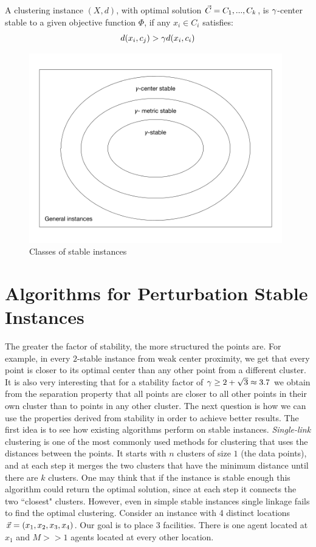 \begin{definition}
A clustering instance $(X, d)$, with optimal solution $\vec{C}= C_1, . . . , C_k$, is $\gamma$-center stable to a given objective function $\Phi$, if any $x_i\in C_i$ satisfies:
\[d(x_i,c_j) > \gamma d(x_i,c_i)\]
\end{definition}

\begin{figure}[ht]
    \centering
    \includegraphics[width=11cm]{Images/stability.png}
    \caption{Classes of stable instances}
    \label{fig:stability}
\end{figure}




\section{Algorithms for Perturbation Stable Instances}

Τhe greater the factor of stability, the more structured the points are. For example, in every $2$-stable instance from weak center proximity, we get that every point is closer to its optimal center than any other point from  a different cluster. It is also very interesting that for a stability factor of $\gamma\ge2+\sqrt{3}\approx3.7$ we obtain from the separation property that all points are closer to all other points in their own cluster than to points in any other cluster. The next question is how we can use the properties derived from stability in order to achieve better results. The first idea is to see how existing algorithms perform on stable instances. \emph{Single-link} clustering is one of the most commonly used methods for clustering that uses the distances between the points. It starts with $n$ clusters of size $1$ (the data points), and at each step it merges the two clusters that have the minimum distance until there are $k$ clusters. One may think that if the instance is stable enough this algorithm could return the optimal solution, since at each step it connects the two ``closest" clusters. However, even in simple stable instances single linkage fails to find the optimal clustering. Consider an instance with 4 distinct locations $\vec{x}=(x_1,x_2,x_3,x_4)$. Our goal is to place $3$ facilities. There is one agent located at $x_1$ and $M>>1$ agents located at every other location. 

